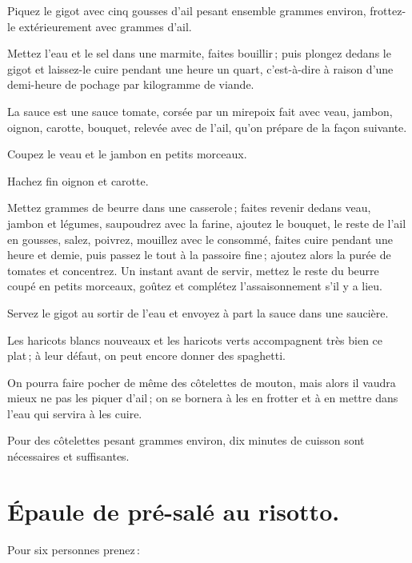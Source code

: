 Piquez le gigot avec cinq gousses d'ail pesant ensemble {\mmm} grammes environ,
frottez-le extérieurement avec {\mmm} grammes d'ail.

Mettez l’eau et le sel dans une marmite, faites bouillir ; puis plongez dedans le
gigot et laissez-le cuire pendant une heure un quart, c'est-à-dire à raison d’une
demi-heure de pochage par kilogramme de viande.

La sauce est une sauce tomate, corsée par un mirepoix fait avec veau, jambon,
oignon, carotte, bouquet, relevée avec de l'ail, qu'on prépare de la façon
suivante.

Coupez le veau et le jambon en petits morceaux.

Hachez fin oignon et carotte.

Mettez {\mmm} grammes de beurre dans une casserole ; faites revenir dedans veau,
jambon et légumes, saupoudrez avec la farine, ajoutez le bouquet, le reste de
l'ail en gousses, salez, poivrez, mouillez avec le consommé, faites cuire
pendant une heure et demie, puis passez le tout à la passoire fine ; ajoutez
alors la purée de tomates et concentrez. Un instant avant de servir, mettez le
reste du beurre coupé en petits morceaux, goûtez et complétez l'assaisonnement
s'il y a lieu.

Servez le gigot au sortir de l'eau et envoyez à part la sauce dans une saucière.

Les haricots blancs nouveaux et les haricots verts accompagnent très bien ce
plat ; à leur défaut, on peut encore donner des spaghetti.

\sk

On pourra faire pocher de même des côtelettes de mouton, mais alors il vaudra
mieux ne pas les piquer d'ail ; on se bornera à les en frotter et à en mettre
dans l’eau qui servira à les cuire.

Pour des côtelettes pesant {\mmm} grammes environ, dix minutes de cuisson sont
nécessaires et suffisantes.

\section*{\centering Épaule de pré-salé au risotto.}
{}

Pour six personnes prenez :

\medskip


